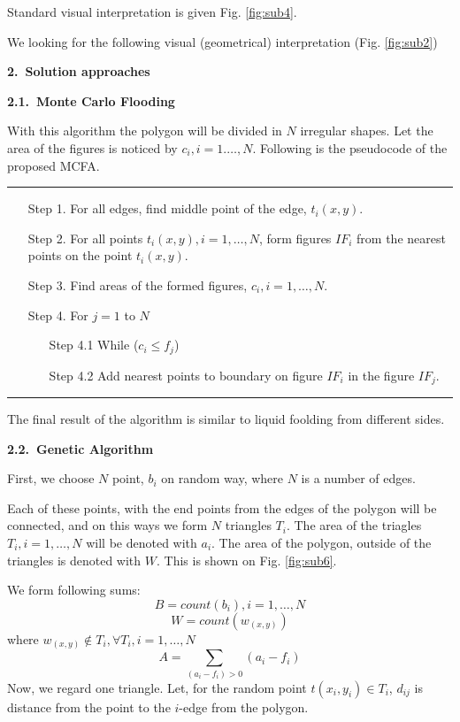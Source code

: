 \documentclass[11pt,leqno]{book}
\newcommand{\sect}[1]{\vskip7mm\par{\large \bf #1}}
\newcommand{\subsect}[1]{\vskip 3mm\par{\bf#1}}
\begin{document}
Standard visual interpretation is given Fig. \ref{fig:sub4}.

We looking for the following visual (geometrical) interpretation (Fig. \ref{fig:sub2})

\sect{2.~Solution approaches}

\subsect{2.1.~Monte Carlo Flooding}

With this algorithm the polygon will be divided in $N$ irregular shapes. Let the area of the figures is noticed by $c_i, i = 1. \ldots, N$.  Following is the pseudocode of the proposed MCFA.

\noindent\rule{\textwidth}{1pt}
\begin{itemize}
\item[Step 1.]  For all edges, find middle point of the edge, $t_i(x,y)$.
\item[Step 2.]  For all points $t_i(x,y), i=1,\ldots, N$, form figures $IF_i$ from the nearest points on the point $t_i(x,y)$. 
\item[Step 3.] Find areas of the formed figures, $c_i, i = 1, \ldots, N$.
\item[Step 4.] For $j = 1$ to $N$
\begin{itemize}
  \item[Step 4.1]  While ($c_i \leq f_j$)
  \item[Step 4.2]  Add nearest points to boundary on figure $IF_i$ in the figure $IF_j$. 
\end{itemize}
\end{itemize}
\noindent\rule{\textwidth}{1pt}

The final result of the algorithm is similar to liquid foolding from different sides.

\subsect{2.2.~Genetic Algorithm}

First, we choose $N$ point, $b_i$  on random way, where $N$ is a number of edges.

Each of these points, with the end points from the edges of the polygon will be connected, and on this ways we form $N$ triangles  $T_i$. The area of the triagles $T_i, i=1, \ldots, N $ will be denoted with $a_i$. The area of the polygon, outside of the triangles is denoted with $W$.  This is shown on Fig. \ref{fig:sub6}.

We form following sums:
$$B= count( b_i), i =1, \ldots, N$$
$$ W= count(w_{(x,y)})$$ where $w_{ (x,y)}\notin T_i, \forall{ T_i}, i=1, \dots, N$
$$ A= \sum_{(a_i - f_i)>0}(a_i-f_i)$$
Now, we regard one triangle.  Let, for the random point $t(x_i, y_i) \in T_i$,  $d_{ij}$  is distance from the point to the $i$-edge from the polygon. 
\end{document}
